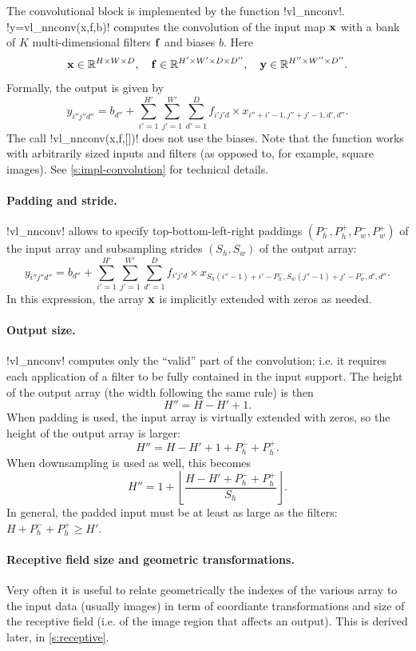The convolutional block is implemented by the function !vl_nnconv!. !y=vl_nnconv(x,f,b)! computes the convolution of the input map $\mathbf{x}$ with a bank of $K$ multi-dimensional filters $\mathbf{f}$ and biases $b$. Here
\[
 \mathbf{x}\in\mathbb{R}^{H \times W \times D}, \quad
 \mathbf{f}\in\mathbb{R}^{H' \times W' \times D \times D''}, \quad
 \mathbf{y}\in\mathbb{R}^{H'' \times W'' \times D''}.
\]
Formally, the output  is given by
\[
y_{i''j''d''}
=
b_{d''}
+
\sum_{i'=1}^{H'}
\sum_{j'=1}^{W'}
\sum_{d'=1}^D
f_{i'j'd} \times x_{i''+i'-1,j''+j'-1,d',d''}.
\]
The call !vl_nnconv(x,f,[])! does not use the biases. Note that the function works with arbitrarily sized inputs and filters (as opposed to, for example, square images). See \autoref{s:impl-convolution} for technical details.

\paragraph{Padding and stride.} !vl_nnconv! allows to specify  top-bottom-left-right paddings $(P_h^-,P_h^+,P_w^-,P_w^+)$ of the input array and subsampling strides $(S_h,S_w)$ of the output array:
\[
y_{i''j''d''}
=
b_{d''}
+
\sum_{i'=1}^{H'}
\sum_{j'=1}^{W'}
\sum_{d'=1}^D
f_{i'j'd} \times x_{S_h (i''-1)+i'-P_h^-, S_w(j''-1)+j' - P_w^-,d',d''}.
\]
In this expression, the array $\mathbf{x}$ is implicitly extended with zeros as needed.

\paragraph{Output size.} !vl_nnconv! computes only the ``valid'' part of the convolution; i.e. it requires each application of a filter to be fully contained in the input support. The height of the output array (the width following the same rule) is then
\[
  H'' = H - H' + 1.
\]
When padding is used, the input array is virtually extended with zeros, so the height of the output array is larger:
\[
  H'' = H - H' + 1 + P_h^- + P_h^+.
\]
When downsampling is used as well, this becomes
\[
  H'' = 1 + \left\lfloor \frac{H - H' + P_h^- + P_h^+}{S_h} \right\rfloor.
\]
In general, the padded input must be at least as large as the filters: $H +P_h^- + P_h^+ \geq H'$.

\paragraph{Receptive field size and geometric transformations.} Very often it is useful to relate geometrically the indexes of the various array to the input data (usually images) in term of coordiante transformations and size of the receptive field (i.e. of the image region that affects an output). This is derived later, in \autoref{s:receptive}.

